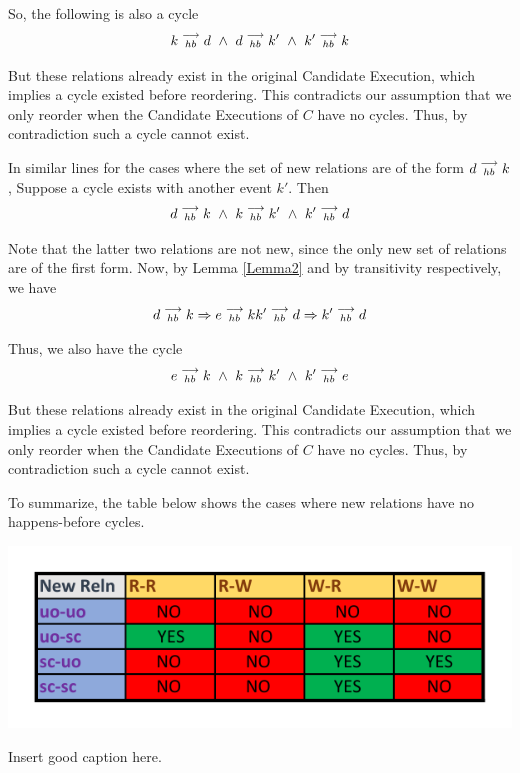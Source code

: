    So, the following is also a cycle
    \[
        k\stackrel{\longrightarrow}{_{hb}}d \ \wedge \
        d\stackrel{\longrightarrow}{_{hb}}k' \ \wedge \
        k'\stackrel{\longrightarrow}{_{hb}}k
    \]

    But these relations already exist in the original Candidate Execution, which implies a cycle existed before reordering. This contradicts our assumption that we only reorder when the Candidate Executions of $C$ have no cycles. Thus, by contradiction such a cycle cannot exist.

    In similar lines for the cases where the set of new relations are of the form $d\stackrel{\longrightarrow}{_{hb}}k$,  Suppose a cycle exists with another event $k'$. Then 
    \begin{align*}
        \reln{d}{hb}{k} \ \wedge \
        \reln{k}{hb}{k'} \ \wedge \ 
        \reln{k'}{hb}{d} 
    \end{align*}

    Note that the latter two relations are not new, since the only new set of relations are of the first form. Now, by Lemma \ref{Lemma2} and by transitivity respectively, we have 
    \begin{align*}
        d\stackrel{\longrightarrow}{_{hb}}k \Rightarrow e\stackrel{\longrightarrow}{_{hb}}k
        k'\stackrel{\longrightarrow}{_{hb}}d \Rightarrow k'\stackrel{\longrightarrow}{_{hb}}d
    \end{align*}

    Thus, we also have the cycle 
    \begin{align*}
        \reln{e}{hb}{k} \ \wedge \
        \reln{k}{hb}{k'} \ \wedge \ 
        \reln{k'}{hb}{e} 
    \end{align*}

    But these relations already exist in the original Candidate Execution, which implies a cycle existed before reordering. This contradicts our assumption that we only reorder when the Candidate Executions of $C$ have no cycles. Thus, by contradiction such a cycle cannot exist.

    To summarize, the table below shows the cases where new relations have no happens-before cycles. 

    \begin{table}[H]
        \centering
        \includegraphics[scale=0.7]{InstructionReordering/ValidReorderingProof/ProofParts/Part3/part3_table.pdf}
        \caption{Insert good caption here.}
        \label{fig:my_label}
    \end{table}

